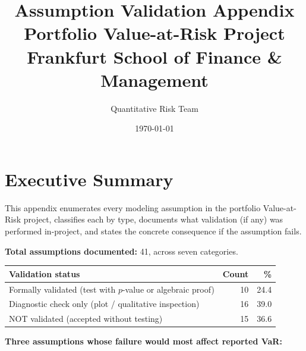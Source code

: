 \documentclass[11pt,a4paper]{article}
\title{Assumption Validation Appendix\\[0.5em]
\large Portfolio Value-at-Risk Project\\
\normalsize Frankfurt School of Finance \& Management}
\author{Quantitative Risk Team}
\date{\today}
\begin{document}
\maketitle
\tableofcontents
\newpage

\section{Executive Summary}\label{sec:executive-summary}

This appendix enumerates every modeling assumption in the portfolio
Value-at-Risk project, classifies each by type, documents what validation
(if any) was performed in-project, and states the concrete consequence if
the assumption fails.

\medskip
\noindent\textbf{Total assumptions documented:} 41, across seven categories.

\medskip
\begin{tabular}{@{}lrr@{}}
\toprule
\textbf{Validation status} & \textbf{Count} & \textbf{\%} \\
\midrule
Formally validated (test with $p$-value or algebraic proof) & 10 & 24.4 \\
Diagnostic check only (plot / qualitative inspection)       & 16 & 39.0 \\
NOT validated (accepted without testing)                    & 15 & 36.6 \\
\bottomrule
\end{tabular}

\medskip
\noindent\textbf{Three assumptions whose failure would most affect reported VaR:}
\end{document}
